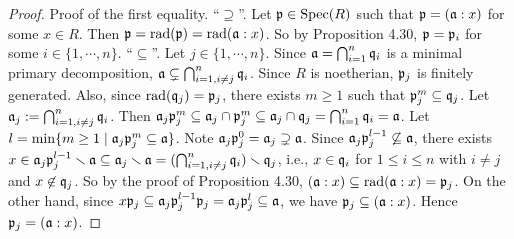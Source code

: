 \begin{proof}
    Proof of the first equality. ``$\supseteq$''. Let $\mathfrak{p} \in \operatorname{Spec}(R)$ such that $\mathfrak{p} = (\mathfrak{a}:x)$ for some $x \in R$. Then $\mathfrak{p} = \operatorname{rad}(\mathfrak{p}) = \operatorname{rad}(\mathfrak{a}:x)$. So by Proposition 4.30, $\mathfrak{p} = \mathfrak{p}_i$ for some $i \in \{1,\cdots,n\}$. ``$\subseteq$''. Let $j \in \{1,\cdots,n\}$. Since $\mathfrak{a} = \bigcap_{i=1}^{n}\mathfrak{q}_i$ is a minimal primary decomposition, $\mathfrak{a} \subsetneq \bigcap_{i=1, i \neq j}^{n} \mathfrak{q}_i$. Since $R$ is noetherian, $\mathfrak{p}_j$ is finitely generated. Also, since $\operatorname{rad}(\mathfrak{q}_j) = \mathfrak{p}_j$, there exists $m \geq 1$ such that $\mathfrak{p}_j^{m} \subseteq \mathfrak{q}_j$. Let $\mathfrak{a}_j := \bigcap_{i=1,i \neq j}^{n} \mathfrak{q}_i$. Then $\mathfrak{a}_j \mathfrak{p}_j^{m} \subseteq \mathfrak{a}_j \cap \mathfrak{p}_j^{m} \subseteq \mathfrak{a}_j \cap \mathfrak{q}_j = \bigcap_{i=1}^{n} \mathfrak{q}_i = \mathfrak{a}$. Let $l = \min\{m \geq 1 \mid \mathfrak{a}_j \mathfrak{p}_j^{m} \subseteq \mathfrak{a}\}$. Note $\mathfrak{a}_j \mathfrak{p}_j^{0} = \mathfrak{a}_j \supsetneq \mathfrak{a}$. Since $\mathfrak{a}_j \mathfrak{p}_j^{l-1} \not \subseteq \mathfrak{a}$, there exists $x \in \mathfrak{a}_j \mathfrak{p}_j^{l-1} \smallsetminus \mathfrak{a} \subseteq \mathfrak{a}_j \smallsetminus \mathfrak{a} = (\bigcap_{i=1,i \neq j}^{n} \mathfrak{q}_i) \smallsetminus \mathfrak{q}_j $, i.e., $x \in \mathfrak{q}_i$ for $1 \leq i \leq n$ with $i \neq j$ and $x \not \in \mathfrak{q}_j$. So by the proof of Proposition 4.30, $(\mathfrak{a}:x) \subseteq \operatorname{rad}(\mathfrak{a}:x) = \mathfrak{p}_j$. On the other hand, since $x\mathfrak{p}_j \subseteq \mathfrak{a}_j\mathfrak{p}_j^{l-1}\mathfrak{p}_j = \mathfrak{a}_j \mathfrak{p}_j^{l} \subseteq \mathfrak{a}$, we have $\mathfrak{p}_j \subseteq (\mathfrak{a}:x)$. Hence $\mathfrak{p}_j = (\mathfrak{a}:x)$.
\end{proof}

